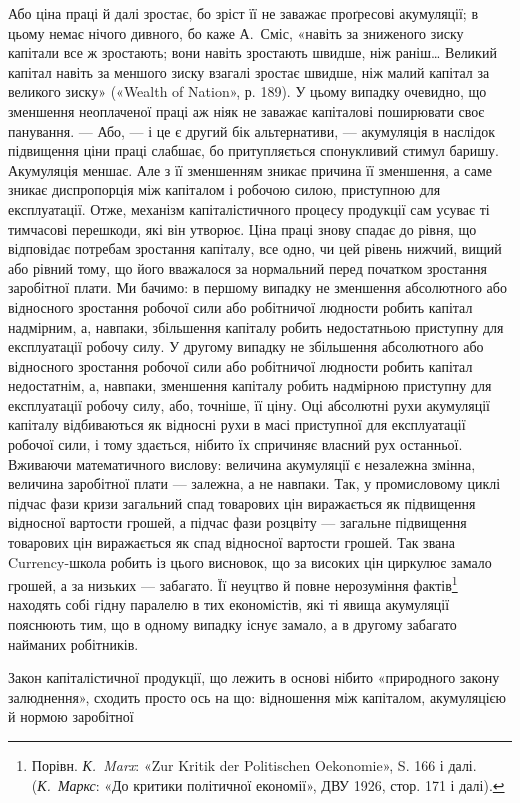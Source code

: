 Або ціна праці й далі зростає, бо зріст її не заважає проґресові
акумуляції; в цьому немає нічого дивного, бо каже А.~Сміс,
«навіть за зниженого зиску капітали все ж зростають; вони навіть
зростають швидше, ніж раніш\dots{} Великий капітал навіть
за меншого зиску взагалі зростає швидше, ніж малий капітал за
великого зиску» («Wealth of Nation», р. 189). У цьому випадку
очевидно, що зменшення неоплаченої праці аж ніяк не заважає
капіталові поширювати своє панування. — Або, — і це є другий
бік альтернативи, — акумуляція в наслідок підвищення ціни
праці слабшає, бо притупляється спонукливий стимул баришу.
Акумуляція меншає. Але з її зменшенням зникає причина її
зменшення, а саме зникає диспропорція між капіталом і робочою
силою, приступною для експлуатації. Отже, механізм капіталістичного
процесу продукції сам усуває ті тимчасові перешкоди,
які він утворює. Ціна праці знову спадає до рівня, що
відповідає потребам зростання капіталу, все одно, чи цей рівень
нижчий, вищий або рівний тому, що його вважалося за нормальний
перед початком зростання заробітної плати. Ми бачимо:
в першому випадку не зменшення абсолютного або відносного
зростання робочої сили або робітничої людности робить капітал
надмірним, а, навпаки, збільшення капіталу робить недостатньою
приступну для експлуатації робочу силу. У другому випадку
не збільшення абсолютного або відносного зростання робочої
сили або робітничої людности робить капітал недостатнім, а,
навпаки, зменшення капіталу робить надмірною приступну для
експлуатації робочу силу, або, точніше, її ціну. Оці абсолютні
рухи акумуляції капіталу відбиваються як відносні рухи в масі
приступної для експлуатації робочої сили, і тому здається, нібито
їх спричиняє власний рух останньої. Вживаючи математичного
вислову: величина акумуляції є незалежна змінна, величина
заробітної плати — залежна, а не навпаки. Так, у промисловому
циклі підчас фази кризи загальний спад товарових цін виражається
як підвищення відносної вартости грошей, а підчас фази
розцвіту — загальне підвищення товарових цін виражається як
спад відносної вартости грошей. Так звана Currency-школа
робить із цього висновок, що за високих цін циркулює замало
грошей, а за низьких — забагато. Її неуцтво й повне нерозуміння
фактів\footnote{
Порівн. \emph{К.~Marx}: «Zur Kritik der Politischen Oekonomie»,
S. 166 і далі. (\emph{К.~Маркс}: «До критики політичної економії», ДВУ 1926,
стор. 171 і далі).
} находять собі гідну паралелю в тих економістів,
які ті явища акумуляції пояснюють тим, що в одному випадку
існує замало, а в другому забагато найманих робітників.

Закон капіталістичної продукції, що лежить в основі нібито
«природного закону залюднення», сходить просто ось на що:
відношення між капіталом, акумуляцією й нормою заробітної
\parbreak{}  %
